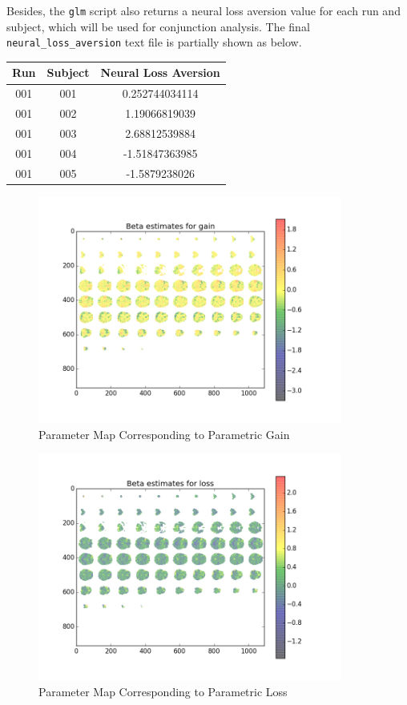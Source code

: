 \par \indent Besides, the \texttt{glm} script also returns a neural loss aversion value for each run and subject, which will be used for conjunction analysis. The final \texttt{neural\_loss\_aversion} text file is partially shown as below.
\begin{table}[h!]
\centering
 \begin{tabular}{||c c c||} 
 \hline
 Run & Subject & Neural Loss Aversion \\ [0.5ex] 
 \hline\hline
 001 & 001 & 0.252744034114\\ 
 001 & 002 & 1.19066819039\\
 001 & 003 & 2.68812539884\\
 001 & 004 & -1.51847363985\\
 001 & 005 & -1.5879238026\\ [1ex] 
 \hline
 \end{tabular}
\end{table}


\begin{figure}[h!]
\centering
\includegraphics[width=100mm]{images/parameter_map_gain.png}               
\caption{Parameter Map Corresponding to Parametric Gain}
\label{fig:beta1}
\end{figure}

\begin{figure}[h!]
\centering
\includegraphics[width=100mm]{images/parameter_map_loss.png}               
\caption{Parameter Map Corresponding to Parametric Loss}
\label{fig:beta2}
\end{figure}

